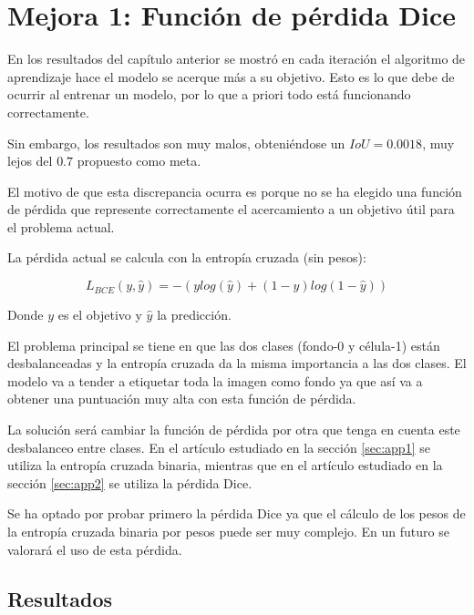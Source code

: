 \chapter{Mejora 1: Función de pérdida Dice}\label{loss_function}

En los resultados del capítulo anterior se mostró en cada iteración el algoritmo de aprendizaje hace el modelo se acerque más a su objetivo. Esto es lo que debe de ocurrir al entrenar un modelo, por lo que a priori todo está funcionando correctamente.

Sin embargo, los resultados son muy malos, obteniéndose un $IoU=0.0018$, muy lejos del $0.7$ propuesto como meta.

El motivo de que esta discrepancia ocurra es porque no se ha elegido una función de pérdida que represente correctamente el acercamiento a un objetivo útil para el problema actual.

La pérdida actual se calcula con la entropía cruzada (sin pesos):

\begin{equation}
L_{BCE}(y,\hat{y})=-(y log(\hat{y}) + (1-y)log(1-\hat{y}))
\end{equation}

Donde $y$ es el objetivo y $\hat{y}$ la predicción.

El problema principal se tiene en que las dos clases (fondo-0 y célula-1) están desbalanceadas y la entropía cruzada da la misma importancia a las dos clases. El modelo va a tender a etiquetar toda la imagen como fondo ya que así va a obtener una puntuación muy alta con esta función de pérdida.

La solución será cambiar la función de pérdida por otra que tenga en cuenta este desbalanceo entre clases. En el artículo estudiado en la sección \ref{sec:app1} se utiliza la entropía cruzada binaria, mientras que en el artículo estudiado en la sección \ref{sec:app2} se utiliza la pérdida Dice.

Se ha optado por probar primero la pérdida Dice ya que el cálculo de los pesos de la entropía cruzada binaria por pesos puede ser muy complejo. En un futuro se valorará el uso de esta pérdida.

\section{Resultados}\label{sec:loss_function_resultados}


